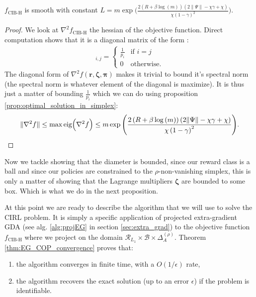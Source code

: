 \begin{proposition}
    \label{prop:f_eg_cop_smooth} $f_\text{CIB-H}$ is smooth with constant $L = m \exp \Big(\frac{2\left(R + \beta \log{\left(m \right)}\right) \left(2  \|\Psi\| - \chi \gamma + \chi\right)}{\chi \left(1- \gamma\right)^{2}} \Big)$.
\end{proposition}

\begin{proof}
    We look at $\nabla^2 f_\text{CIB-H}$ the hessian of the objective function. Direct computation shows that it is a diagonal matrix of the form :
    \begin{align*}
        [\nabla^2 f(\bm{r},\bm{\zeta},\bm{\pi})]_{i,j} = \begin{cases}
            \frac{1}{p_i} & \text{if } i=j\\
            0 & \text{otherwise}.
        \end{cases}
    \end{align*}
    The diagonal form of $\nabla^2 f(\bm{r},\bm
    {\zeta},\bm{\pi})$ makes it trivial to bound it's spectral norm (the spectral norm is whatever element of the diagonal is maximize). It is thus just a matter of bounding $\frac{1}{p_i}$ which we can do using proposition \ref{prop:optimal_solution_in_simplex}:
    \begin{align*}
        \| \nabla^2 f \| \leq \max \text{eig} \Bigl( \nabla^2 f \Bigr) \leq m \exp \Bigg(\frac{2\left(R + \beta \log{\left(m \right)}\right) \left(2  \|\Psi\| - \chi \gamma + \chi\right)}{\chi \left(1- \gamma\right)^{2}} \Bigg).
    \end{align*}
\end{proof}

Now we tackle showing that the diameter is bounded, since our reward class is a ball and since our policies are constrained to the $\rho$-non-vanishing simplex, this is only a matter of showing that the Lagrange multipliers $\bm{\zeta}$ are bounded to some box. Which is what we do in the next proposition.

At this point we are ready to describe the algorithm that we will use to solve the CIRL problem. It is simply a specific application of projected extra-gradient GDA (see alg. \ref{alg:projEG} in section \ref{sec:extra_grad}) to the objective function $f_\text{CIB-H}$ where we project on the domain $\mathcal{R}_{L_1}\times \mathcal{B} \times \Delta_A^{(\rho)}$. Theorem \ref{thm:EG_COP_convergence} proves that:
\begin{enumerate}
    \item the algorithm converges in finite time, with a $O(1/\epsilon)$ rate,
    \item the algorithm recovers the exact solution (up to an error $\epsilon$) if the problem is identifiable.
\end{enumerate}

